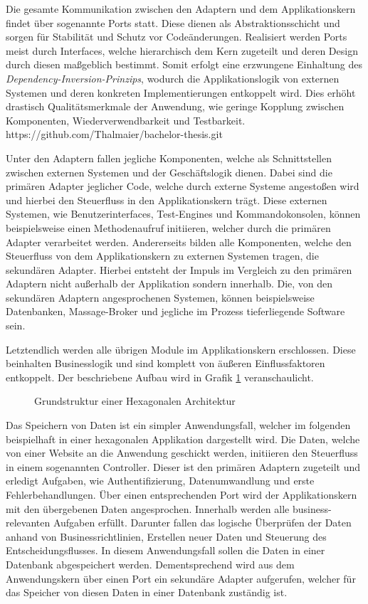 Die gesamte Kommunikation zwischen den Adaptern und dem Applikationskern findet über sogenannte Ports statt. Diese dienen als Abstraktionsschicht und sorgen für Stabilität und Schutz vor Codeänderungen. Realisiert werden Ports meist durch Interfaces, welche hierarchisch dem Kern zugeteilt und deren Design durch diesen maßgeblich bestimmt. Somit erfolgt eine erzwungene Einhaltung des \emph{Dependency-Inversion-Prinzips}, wodurch die Applikationslogik von externen Systemen und deren konkreten Implementierungen entkoppelt wird. Dies erhöht drastisch Qualitätsmerkmale der Anwendung, wie geringe Kopplung zwischen Komponenten, Wiederverwendbarkeit und Testbarkeit. https://github.com/Thalmaier/bachelor-thesis.git

Unter den Adaptern fallen jegliche Komponenten, welche als Schnittstellen zwischen externen Systemen und der Geschäftslogik dienen. Dabei sind die primären Adapter jeglicher Code, welche durch externe Systeme angestoßen wird und hierbei den Steuerfluss in den Applikationskern trägt. Diese externen Systemen, wie Benutzerinterfaces, Test-Engines und Kommandokonsolen, können beispielsweise einen Methodenaufruf initiieren, welcher durch die primären Adapter verarbeitet werden. Andererseits bilden alle Komponenten, welche den Steuerfluss von dem Applikationskern zu externen Systemen tragen, die sekundären Adapter. Hierbei entsteht der Impuls im Vergleich zu den primären Adaptern nicht außerhalb der Applikation sondern innerhalb. Die, von den sekundären Adaptern angesprochenen Systemen, können beispielsweise Datenbanken, Massage-Broker und jegliche im Prozess tieferliegende Software sein. 

Letztendlich werden alle übrigen Module im Applikationskern erschlossen. Diese beinhalten Businesslogik und sind komplett von äußeren Einflussfaktoren entkoppelt. Der beschriebene Aufbau wird in Grafik \ref{fig:HexagonaleArchitektur} veranschaulicht.

\begin{figure}[htbp]
	\centering
	
	\caption{Grundstruktur einer Hexagonalen Architektur}
	\label{fig:HexagonaleArchitektur}
\end{figure}

Das Speichern von Daten ist ein simpler Anwendungsfall, welcher im folgenden beispielhaft in einer hexagonalen Applikation dargestellt wird. Die Daten, welche von einer Website an die Anwendung geschickt werden, initiieren den Steuerfluss in einem sogenannten Controller. Dieser ist den primären Adaptern zugeteilt und erledigt Aufgaben, wie Authentifizierung, Datenumwandlung und erste Fehlerbehandlungen. Über einen entsprechenden Port wird der Applikationskern mit den übergebenen Daten angesprochen. Innerhalb werden alle business-relevanten Aufgaben erfüllt. Darunter fallen das logische Überprüfen der Daten anhand von Businessrichtlinien, Erstellen neuer Daten und Steuerung des Entscheidungsflusses. In diesem Anwendungsfall sollen die Daten in einer Datenbank abgespeichert werden. Dementsprechend wird aus dem Anwendungskern über einen Port ein sekundäre Adapter aufgerufen, welcher für das Speicher von diesen Daten in einer Datenbank zuständig ist.

